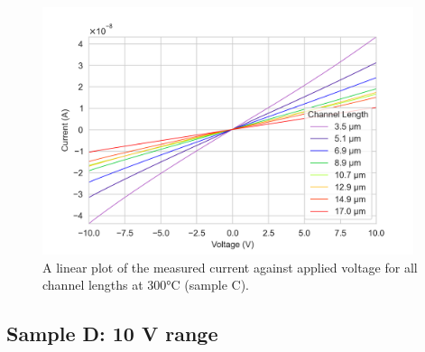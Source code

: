 \begin{figure}[h]
    \centering
    \includegraphics[width=0.97\textwidth]{Chapter6/Figs/Raster/Sample C 2019/IV/10V IV characteristics at 300 C.png}
    \caption{A linear plot of the measured current against applied voltage for all channel lengths at 300\si{\degreeCelsius} (sample C).}
    \label{appfig:C_current_voltage_300}
\end{figure}

\subsection{Sample D: 10 \si{\volt} range}

